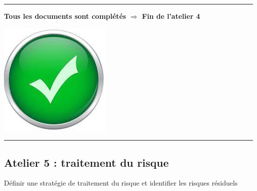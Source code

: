 \documentclass[french, 12pt]{article}%
\newcommand{\titreencadre}{Titre}
\newenvironment{encadre}[1]{\renewcommand{\titreencadre}{#1}
	\begin{mdframed}[style=encadrestyle]
	\vspace{0.5\baselineskip}
	}{%
	\end{mdframed}}
\begin{document}
\vspace{0.5cm}
\begin{center}
 \rule{0.75\linewidth}{1pt}
\end{center}
\begin{minipage}[c]{0.59\linewidth}

\textbf{Tous les documents sont complétés $\Rightarrow$ Fin de l'atelier 4}
\end{minipage}
\begin{minipage}[c]{0.4\linewidth}
\begin{center}
\includegraphics[scale=0.1]{./ressource/OKLogo}
\end{center}
\end{minipage}
\begin{center}
 \rule{0.75\linewidth}{1pt}
\end{center}









\subsection{Atelier 5 : traitement du risque}
\begin{encadre}{Objectif}
Définir une stratégie de traitement du risque et identifier les risques résiduels
\end{encadre}
\end{document}
